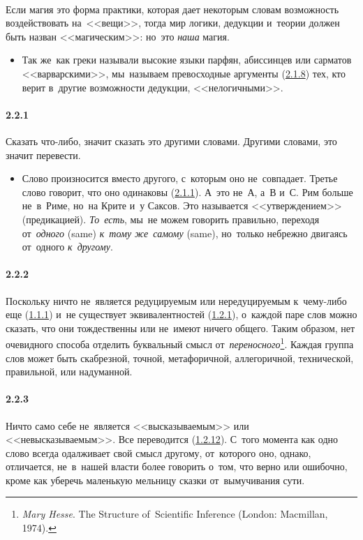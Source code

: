 \paragraph{}\hypertarget{par:}{} Если магия это форма практики, которая дает некоторым словам возможность воздействовать на~<<вещи>>, тогда мир логики, дедукции и~теории должен быть назван <<магическим>>: но~это {\itshape наша} магия. 
	\begin{itemize}
	\item 
	Так же~как греки называли высокие языки парфян, абиссинцев или сарматов <<варварскими>>, мы~называем превосходные аргументы (\hyperlink{par:2.1.8}{2.1.8}) тех, кто верит в~другие возможности дедукции, <<нелогичными>>.
	\end{itemize}

\paragraph{2.2.1}\hypertarget{par:2.2.1}{} Сказать что-либо, значит сказать это другими словами. Другими словами, это значит перевести.
	\begin{itemize}
	\item 
	Слово произносится вместо другого, с~которым оно не~совпадает. Третье слово говорит, что оно одинаковы (\hyperlink{par:2.1.1}{2.1.1}). А~это не~А, а~В и~С. Рим больше не~в~Риме, но~на Крите и~у Саксов. Это называется <<утверждением>> (предикацией). {\itshape То~есть}, мы~не можем говорить правильно, переходя от~{\itshape одного} (same) {\itshape к~тому же~самому} (same), но~только небрежно двигаясь от~одного {\itshape к~другому}.
	\end{itemize}

\paragraph{2.2.2}\hypertarget{par:2.2.2}{} Поскольку ничто не~является редуцируемым или нередуцируемым к~чему-либо еще (\hyperlink{par:1.1.1}{1.1.1}) и~не существует эквивалентностей (\hyperlink{par:1.2.1}{1.2.1}), о~каждой паре слов можно сказать, что они тождественны или не~имеют ничего общего. Таким образом, нет очевидного способа отделить буквальный смысл от~{\itshape переносного}\footnote{{\itshape Mary Hesse}. The Structure of~Scientific Inference (London: Macmillan, 1974).}. Каждая группа слов может быть скабрезной, точной, метафоричной, аллегоричной, технической, правильной, или надуманной.

\paragraph{2.2.3}\hypertarget{par:2.2.3}{} Ничто само себе не~является <<высказываемым>> или <<невысказываемым>>. Все переводится (\hyperlink{par:1.2.12}{1.2.12}). С~того момента как одно слово всегда одалживает свой смысл другому, от~которого оно, однако, отличается, не~в~нашей власти более говорить о~том, что верно или ошибочно, кроме как уберечь маленькую мельницу сказки от~вымучивания сути.

